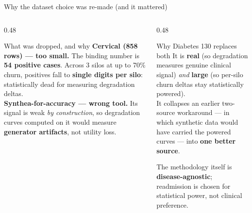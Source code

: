 \documentclass[aspectratio=169, 11pt]{beamer}
\begin{document}
\begin{frame}{Why the dataset choice was re-made (and it mattered)}
\begin{columns}[T]
\begin{column}{0.48\textwidth}
\begin{alertblock}{What was dropped, and why}
\textbf{Cervical (858 rows) --- too small.} The binding number is
\textbf{54 positive cases}. Across 3 silos at up to 70\% churn, positives fall
to \textbf{single digits per silo}: statistically dead for measuring
degradation deltas.\\[0.5em]
\textbf{Synthea-for-accuracy --- wrong tool.} Its signal is weak
\emph{by construction}, so degradation curves computed on it would measure
\textbf{generator artifacts}, not utility loss.
\end{alertblock}
\end{column}
\begin{column}{0.48\textwidth}
\begin{exampleblock}{Why Diabetes 130 replaces both}
It is \textbf{real} (so degradation measures genuine clinical signal)
\emph{and} \textbf{large} (so per-silo churn deltas stay statistically
powered).\\[0.5em]
It collapses an earlier two-source workaround --- in which synthetic data
would have carried the powered curves --- into \textbf{one better source}.
\end{exampleblock}
\vspace{0.3em}
{\footnotesize The methodology itself is \textbf{disease-agnostic};
readmission is chosen for statistical power, not clinical preference.}
\end{column}
\end{columns}
\end{frame}
\end{document}
